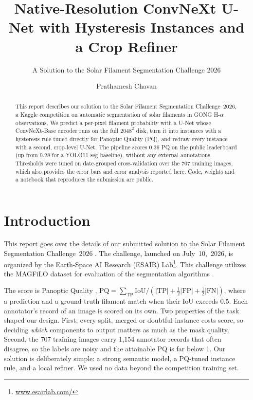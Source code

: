 \documentclass[sigconf]{acmart}
\begin{document}
\title{Native-Resolution ConvNeXt U-Net with Hysteresis Instances and a Crop Refiner}
\subtitle{A Solution to the Solar Filament Segmentation Challenge 2026} %

\author{Prathamesh Chavan}

\begin{abstract}
    This report describes our solution to the Solar Filament Segmentation Challenge~2026, a Kaggle competition on automatic segmentation of solar filaments in GONG H-$\alpha$ observations. We predict a per-pixel filament probability with a U-Net whose ConvNeXt-Base encoder runs on the full $2048^2$ disk, turn it into instances with a hysteresis rule tuned directly for Panoptic Quality (PQ), and redraw every instance with a second, crop-level U-Net. The pipeline scores 0.39 PQ on the public leaderboard (up from 0.28 for a YOLO11-seg baseline), without any external annotations. Thresholds were tuned on date-grouped cross-validation over the 707 training images, which also provides the error bars and error analysis reported here. Code, weights and a notebook that reproduces the submission are public.
\end{abstract}

\maketitle

\section{Introduction}
    This report goes over the details of our submitted solution to the Solar Filament Segmentation Challenge~2026 \cite{filament-segmentation-2026}. The challenge, launched on July~10,~2026, is organized by the Earth-Space AI Research (ESAIR) Lab\footnote{\href{https://www.esairlab.com/home}{www.esairlab.com/}}. This challenge utilizes the MAGFiLO dataset for evaluation of the segmentation algorithms \cite{ahmadzadeh2024dataset}.

    The score is Panoptic Quality \cite{kirillov2019panoptic}, $\mathrm{PQ} = \sum_{\mathrm{TP}} \mathrm{IoU} / (|\mathrm{TP}| + \tfrac12|\mathrm{FP}| + \tfrac12|\mathrm{FN}|)$, where a prediction and a ground-truth filament match when their IoU exceeds 0.5. Each annotator's record of an image is scored on its own. Two properties of the task shaped our design. First, every split, merged or doubtful instance costs score, so deciding \emph{which} components to output matters as much as the mask quality. Second, the 707 training images carry 1,154 annotator records that often disagree, so the labels are noisy and the attainable PQ is far below 1. Our solution is deliberately simple: a strong semantic model, a PQ-tuned instance rule, and a local refiner. We used no data beyond the competition training set.
\end{document}
